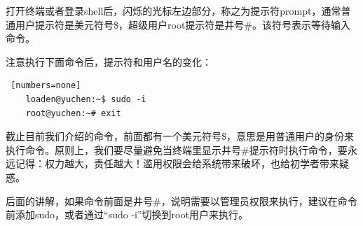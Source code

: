 \par 打开终端或者登录shell后，闪烁的光标左边部分，称之为提示符prompt，通常普通用户提示符是美元符号\$，超级用户root提示符是井号\#。该符号表示等待输入命令。
\par 注意执行下面命令后，提示符和用户名的变化：

\begin{lstlisting} [numbers=none]
    loaden@yuchen:~$ sudo -i
    root@yuchen:~# exit
\end{lstlisting}

\par 截止目前我们介绍的命令，前面都有一个美元符号\$，意思是用普通用户的身份来执行命令。原则上，我们要尽量避免当终端里显示井号\#提示符时执行命令，要永远记得：权力越大，责任越大！滥用权限会给系统带来破坏，也给初学者带来疑惑。
\par 后面的讲解，如果命令前面是井号\#，说明需要以管理员权限来执行，建议在命令前添加sudo，或者通过“sudo -i”切换到root用户来执行。


\ifx\all\undefined

\fi
